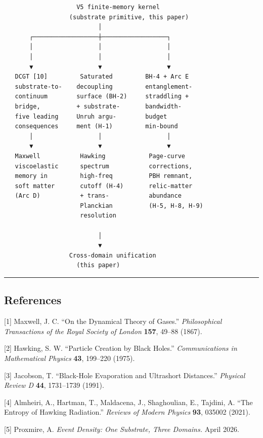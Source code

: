 \documentclass[
  11pt,
  a4paperpaper,
]{article}
\begin{document}
\begin{verbatim}
                    V5 finite-memory kernel
                  (substrate primitive, this paper)
                          │
       ┌──────────────────┼──────────────────┐
       │                  │                  │
       │                  │                  │
       ▼                  ▼                  ▼
   DCGT [10]         Saturated         BH-4 + Arc E
   substrate-to-    decoupling         entanglement-
   continuum        surface (BH-2)     straddling +
   bridge,          + substrate-       bandwidth-
   five leading     Unruh argu-        budget
   consequences     ment (H-1)         min-bound
       │                  │                  │
       ▼                  ▼                  ▼
   Maxwell           Hawking            Page-curve
   viscoelastic      spectrum           corrections,
   memory in         high-freq          PBH remnant,
   soft matter       cutoff (H-4)       relic-matter
   (Arc D)           + trans-           abundance
                     Planckian          (H-5, H-8, H-9)
                     resolution

                          │
                          ▼
                  Cross-domain unification
                    (this paper)
\end{verbatim}

\begin{center}\rule{0.5\linewidth}{0.5pt}\end{center}

\subsection{References}\label{references}

{[}1{]} Maxwell, J. C. ``On the Dynamical Theory of Gases.''
\emph{Philosophical Transactions of the Royal Society of London}
\textbf{157}, 49--88 (1867).

{[}2{]} Hawking, S. W. ``Particle Creation by Black Holes.''
\emph{Communications in Mathematical Physics} \textbf{43}, 199--220
(1975).

{[}3{]} Jacobson, T. ``Black-Hole Evaporation and Ultrashort
Distances.'' \emph{Physical Review D} \textbf{44}, 1731--1739 (1991).

{[}4{]} Almheiri, A., Hartman, T., Maldacena, J., Shaghoulian, E.,
Tajdini, A. ``The Entropy of Hawking Radiation.'' \emph{Reviews of
Modern Physics} \textbf{93}, 035002 (2021).

{[}5{]} Proxmire, A. \emph{Event Density: One Substrate, Three Domains.}
April 2026.
\end{document}
